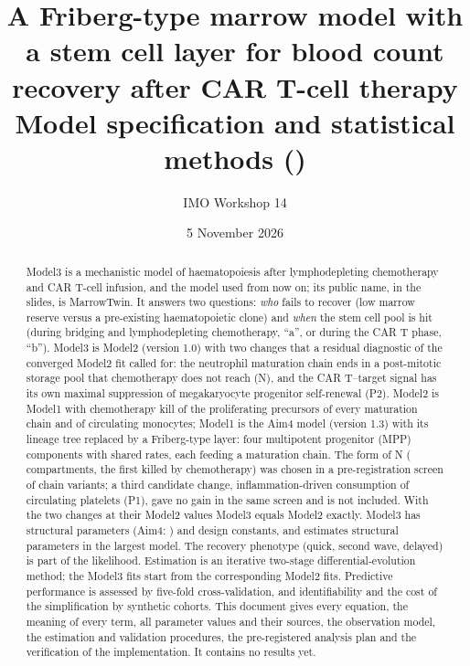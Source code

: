 \documentclass[11pt]{article}
\title{A Friberg-type marrow model with a stem cell layer for blood count recovery after CAR T-cell therapy\\[4pt]
\large Model specification and statistical methods (\valVersion)}
\author{IMO Workshop 14}
\date{5 November 2026}
\begin{document}
\maketitle

\begin{abstract}
\noindent Model3 is a mechanistic model of haematopoiesis after lymphodepleting chemotherapy and CAR T-cell infusion, and the model used from now on; its public name, in the slides, is MarrowTwin. It answers two questions: \emph{who} fails to recover (low marrow reserve versus a pre-existing haematopoietic clone) and \emph{when} the stem cell pool is hit (during bridging and lymphodepleting chemotherapy, ``a'', or during the CAR T phase, ``b''). Model3 is Model2 (version 1.0) with two changes that a residual diagnostic of the converged Model2 fit called for: the neutrophil maturation chain ends in a post-mitotic storage pool that chemotherapy does not reach (N), and the CAR T--target signal has its own maximal suppression of megakaryocyte progenitor self-renewal (P2). Model2 is Model1 with chemotherapy kill of the proliferating precursors of every maturation chain and of circulating monocytes; Model1 is the Aim4 model (version 1.3) with its lineage tree replaced by a Friberg-type layer: four multipotent progenitor (MPP) components with shared rates, each feeding a maturation chain. The form of N (\valNTrN{} compartments, the first \valNkN{} killed by chemotherapy) was chosen in a pre-registration screen of \valNScreenN{} chain variants; a third candidate change, inflammation-driven consumption of circulating platelets (P1), gave no gain in the same screen and is not included. With the two changes at their Model2 values Model3 equals Model2 exactly. Model3 has \valNStruct{} structural parameters (Aim4: \valNStructAimFour) and \valNDesign{} design constants, and estimates \valNEst{} structural parameters in the largest model. The recovery phenotype (quick, second wave, delayed) is part of the likelihood. Estimation is an iterative two-stage differential-evolution method; the Model3 fits start from the corresponding Model2 fits. Predictive performance is assessed by five-fold cross-validation, and identifiability and the cost of the simplification by synthetic cohorts. This document gives every equation, the meaning of every term, all parameter values and their sources, the observation model, the estimation and validation procedures, the pre-registered analysis plan and the verification of the implementation. It contains no results yet.
\end{abstract}
\end{document}
